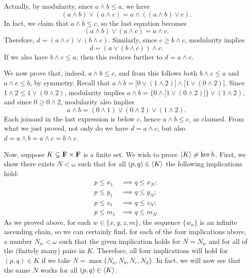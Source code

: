 Actually, by modularity, since $a\wedge b \leq a$, we have 
\[
(a \wedge b) \vee (a \wedge c) = a \wedge ((a\wedge b) \vee c).
\]
In fact, we claim that $a\wedge b \leq c$, so the last equation becomes 
\[
(a \wedge b) \vee (a \wedge c) = a \wedge c.
\]
Therefore, $d = (a \wedge c) \vee (b \wedge c)$. Similarly, since 
$c \geq b \wedge c$, modularity implies 
\[ 
d = (a \vee (b \wedge c)) \wedge c.
\]
If we also have $b \wedge c \leq a$, then this reduces further to $d = a  \wedge c$.

We now prove that, indeed, $a\wedge b \leq c$, and from this follows both $b \wedge c\leq a$ and $a \wedge c\leq b$, by symmetry. Recall that 
$a \wedge b = \bigl[0\vee (1 \wedge 2)\bigr] \wedge \bigl[1\vee (0 \wedge 2)\bigr]$.
Since $1 \wedge 2 \leq 1\vee (0 \wedge 2)$, modularity implies
$a \wedge b = \bigl\{0\wedge \bigl[1\vee (0 \wedge 2)\bigr]\bigr\} \vee 
(1 \wedge 2)$, and since $0 \geq 0 \wedge 2$, modularity also implies
\[
a \wedge b = (0\wedge 1)\vee (0 \wedge 2) \vee (1 \wedge 2).
\]
Each joinand in the last expression is below $c$,
hence $a\wedge b \leq c$, as claimed.
From what we just proved, not only do we have $d = a \wedge c$, but also 
$d = a\wedge b = a\wedge c = b \wedge c$.

Now, suppose $K \subseteq \mathbf{F} \times \mathbf{F}$ is a finite set. 
We wish to prove $\langle K\rangle \neq \ker h$.
First, we show there exists $N < \omega$ such that 
for all $(p, q) \in \langle K\rangle$ 
the following implications hold:
\begin{align}
p \leq x_1 &\implies q \leq x_N; \label{eq:acc1}\\
p \leq y_1 &\implies q \leq y_N; \label{eq:acc2}\\ 
p \leq z_1 &\implies q \leq z_N; \label{eq:acc3}\\
p \leq m_1 &\implies q \leq m_N. \label{eq:acc4}
\end{align}
As we proved above, for each $w \in \{x, y, z, m\}$, the sequence $\{w_n\}$
is an infinite ascending chain, so we can certainly find, for each of the four
implications above, a number $N_w < \omega$ such that the given implication
holds for $N = N_w$ and for all of the (finitely many) pairs in $K$. 
Therefore, all four implications will hold for $(p, q) \in K$ if we take 
$N = \max \{N_a, N_b, N_c, N_d\}$. In fact, we will now see that the same $N$
works for all $(p, q) \in \langle K\rangle$.

